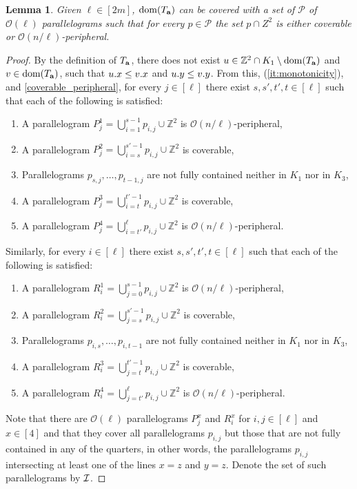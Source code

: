 \documentclass[11pt, letterpaper]{article}
\theoremstyle{plain}
\newtheorem{lemma}{Lemma}
\theoremstyle{definition}
\theoremstyle{remark}
\newcommand{\Z}{\mathbb{Z}}
\renewcommand{\O}{\mathcal{O}}
\begin{document}
\begin{lemma}\label{lm:parallelogram_merge}
Given $\ell \in [2m]$, $\operatorname*{dom}(T_\mathbf{a})$ can be covered with a set of $\mathcal{P}$ of $\O(\ell)$ parallelograms such that for every $p \in \mathcal{P}$ the set $p \cap Z^2$ is either coverable or $\O(n / \ell)$-peripheral. 
\end{lemma}
\begin{proof}
By the definition of $T_\mathbf{a}$, there does not exist $u \in \Z^2 \cap K_1 \setminus \d{\Ta}$ and $v \in \operatorname*{dom}(T_\mathbf{a})$, such that $u.x \le v.x$ and $u.y \le v.y$. From this,  (\ref{it:monotonicity}), and \ref{coverable_peripheral}, for every $j \in [\ell]$ there exist $s,s', t',t \in [\ell]$  such that each of the following is satisfied:
\begin{enumerate}
	\item A parallelogram $P_j^1 = \bigcup_{i=1}^{s-1} p_{i, j} \cup \Z^2$ is $\O(n/\ell)$-peripheral,
	\item A parallelogram $P_j^2 = \bigcup_{i=s}^{s'-1} p_{i, j} \cup \Z^2$ is coverable, 
	\item Parallelograms $p_{s, j}, \dots, p_{t - 1, j}$ are not fully contained neither in $K_1$ nor in $K_3$,
	\item A parallelogram $P_j^3 = \bigcup_{i=t}^{t'-1} p_{i, j} \cup \Z^2$ is coverable,
	\item A parallelogram $P_j^4 = \bigcup_{i=t'}^{\ell} p_{i, j} \cup \Z^2$ is $\O(n/\ell)$-peripheral.
\end{enumerate}

Similarly, for every $i \in [\ell]$ there exist $s,s', t',t \in [\ell]$  such that each of the following is satisfied:
\begin{enumerate}
	\item A parallelogram $R_i^1 = \bigcup_{j=0}^{s-1} p_{i, j} \cup \Z^2$ is $\O(n/\ell)$-peripheral,
	\item A parallelogram $R_i^2 = \bigcup_{j=s}^{s'-1} p_{i, j} \cup \Z^2$ is coverable, 
	\item Parallelograms $p_{i, s}, \dots, p_{i, t-1}$ are not fully contained neither in $K_1$ nor in $K_3$,
	\item A parallelogram $R_i^3 = \bigcup_{j=t}^{t'-1} p_{i, j} \cup \Z^2$ is coverable,
	\item A parallelogram $R_i^4 = \bigcup_{j=t'}^{\ell} p_{i, j} \cup \Z^2$ is $\O(n/\ell)$-peripheral. 
\end{enumerate}

Note that there are $\O(\ell)$ parallelograms $P_j^x$ and $R_i^x$ for $i,j \in [\ell]$ and $x \in [4]$ and that they cover all parallelograms $p_{i,j}$ but those that are not fully contained in any of the quarters, in other words, the parallelograms $p_{i, j}$ intersecting  at least one of the lines $x = z$ and $y = z$. Denote the set of such parallelograms by $\mathcal{I}$. 


\end{proof}
\end{document}
